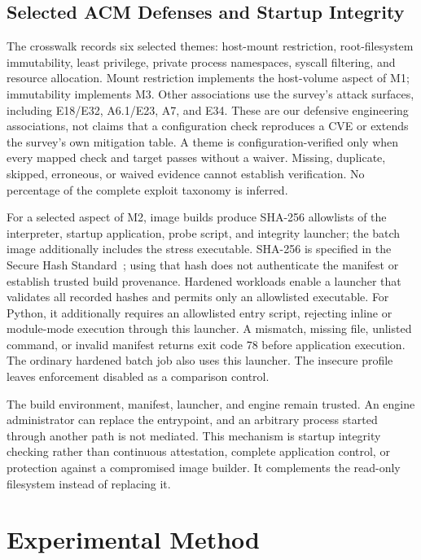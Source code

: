 \documentclass[conference,letterpaper]{IEEEtran}
\begin{document}
\subsection{Selected ACM Defenses and Startup Integrity}
The crosswalk records six selected themes: host-mount restriction, root-filesystem immutability, least privilege, private process namespaces, syscall filtering, and resource allocation. Mount restriction implements the host-volume aspect of M1; immutability implements M3. Other associations use the survey's attack surfaces, including E18/E32, A6.1/E23, A7, and E34. These are our defensive engineering associations, not claims that a configuration check reproduces a CVE or extends the survey's own mitigation table. A theme is configuration-verified only when every mapped check and target passes without a waiver. Missing, duplicate, skipped, erroneous, or waived evidence cannot establish verification. No percentage of the complete exploit taxonomy is inferred.

For a selected aspect of M2, image builds produce SHA-256 allowlists of the interpreter, startup application, probe script, and integrity launcher; the batch image additionally includes the stress executable. SHA-256 is specified in the Secure Hash Standard~\cite{sha256}; using that hash does not authenticate the manifest or establish trusted build provenance. Hardened workloads enable a launcher that validates all recorded hashes and permits only an allowlisted executable. For Python, it additionally requires an allowlisted entry script, rejecting inline or module-mode execution through this launcher. A mismatch, missing file, unlisted command, or invalid manifest returns exit code 78 before application execution. The ordinary hardened batch job also uses this launcher. The insecure profile leaves enforcement disabled as a comparison control.

The build environment, manifest, launcher, and engine remain trusted. An engine administrator can replace the entrypoint, and an arbitrary process started through another path is not mediated. This mechanism is startup integrity checking rather than continuous attestation, complete application control, or protection against a compromised image builder. It complements the read-only filesystem instead of replacing it.

\section{Experimental Method}
\end{document}
